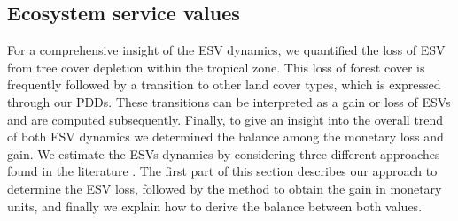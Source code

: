 	\subsection{Ecosystem service values}
	\label{subsec:methods_esv}
		For a comprehensive insight of the \ac{ESV} dynamics, we quantified the loss of \ac{ESV} from tree cover depletion within the tropical zone. This loss of forest cover is frequently followed by a transition to other land cover types, which is expressed through our \acp{PDD}. These transitions can be interpreted as a gain or loss of \acp{ESV} and are computed subsequently. Finally, to give an insight into the overall trend of both \ac{ESV} dynamics we determined the balance among the monetary loss and gain. We estimate the \acp{ESV} dynamics by considering three different approaches found in the literature \citep{Costanza2014,Groot2012,Siikamaki2015}. The first part of this section describes our approach to determine the \ac{ESV} loss, followed by the method to obtain the gain in monetary units, and finally we explain how to derive the balance between both values.

